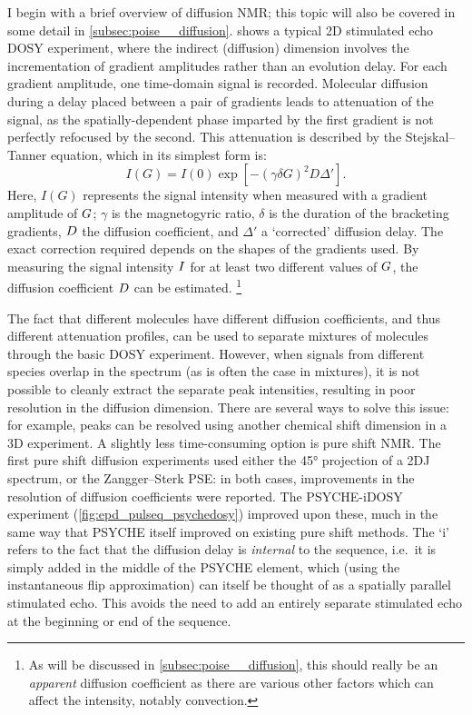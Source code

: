 I begin with a brief overview of diffusion NMR\autocite{Johnson1999PNMRS}; this topic will also be covered in some detail in \cref{subsec:poise__diffusion}.
 shows a typical 2D stimulated echo DOSY experiment, where the indirect (diffusion) dimension involves the incrementation of gradient amplitudes rather than an evolution delay.
For each gradient amplitude, one time-domain signal is recorded.
Molecular diffusion during a delay placed between a pair of gradients leads to attenuation of the signal, as the spatially-dependent phase imparted by the first gradient is not perfectly refocused by the second.
This attenuation is described by the Stejskal--Tanner equation\autocite{Stejskal1965JCP,Sinnaeve2012CMR}, which in its simplest form is:
\begin{equation}
    \label{eq:stejskal_tanner}
    I(G) = I(0) \exp\left[-(\gamma\delta G)^2 D \Delta'\right].
\end{equation}
Here, $I(G)$ represents the signal intensity when measured with a gradient amplitude of $G\/$; $\gamma$ is the magnetogyric ratio, $\delta$ is the duration of the bracketing gradients, $D\/$ the diffusion coefficient, and $\Delta'$ a `corrected' diffusion delay.
The exact correction required depends on the shapes of the gradients used.
By measuring the signal intensity $I\/$ for at least two different values of $G\/$, the diffusion coefficient $D\/$ can be estimated.%
\footnote{As will be discussed in \cref{subsec:poise__diffusion}, this should really be an \textit{apparent} diffusion coefficient as there are various other factors which can affect the intensity, notably convection.}

The fact that different molecules have different diffusion coefficients, and thus different attenuation profiles, can be used to separate mixtures of molecules through the basic DOSY experiment.
However, when signals from different species overlap in the \proton{} spectrum (as is often the case in mixtures), it is not possible to cleanly extract the separate peak intensities, resulting in poor resolution in the diffusion dimension.
There are several ways to solve this issue: for example, peaks can be resolved using another chemical shift dimension in a 3D experiment.
A slightly less time-consuming option is pure shift NMR.
The first pure shift diffusion experiments used either the \ang{45} projection of a 2DJ spectrum\autocite{Cobas2004JMR}, or the Zangger--Sterk PSE\autocite{Nilsson2007CC,Aguilar2010ACIE,Glanzer2014CEJ}: in both cases, improvements in the resolution of diffusion coefficients were reported.
The PSYCHE-iDOSY experiment\autocite{Foroozandeh2016ACIE} (\cref{fig:epd_pulseq_psychedosy}) improved upon these, much in the same way that PSYCHE itself improved on existing pure shift methods.
The `i' refers to the fact that the diffusion delay is \textit{internal} to the sequence, i.e.\ it is simply added in the middle of the PSYCHE element, which (using the instantaneous flip approximation) can itself be thought of as a spatially parallel stimulated echo.
This avoids the need to add an entirely separate stimulated echo at the beginning or end of the sequence.

